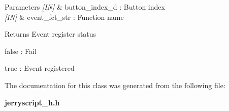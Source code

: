 \begin{DoxyParams}{Parameters}
{\em \mbox{[}\+I\+N\mbox{]}} & button\+\_\+index\+\_\+d \+: Button index \\
\hline
{\em \mbox{[}\+I\+N\mbox{]}} & event\+\_\+fct\+\_\+str \+: Function name \\
\hline
\end{DoxyParams}
\begin{DoxyReturn}{Returns}
Event register status \begin{DoxyItemize}
\item false \+: Fail \item true \+: Event registered \end{DoxyItemize}

\end{DoxyReturn}


The documentation for this class was generated from the following file\+:\begin{DoxyCompactItemize}
\item 
\textbf{ jerryscript\+\_\+h.\+h}\end{DoxyCompactItemize}
